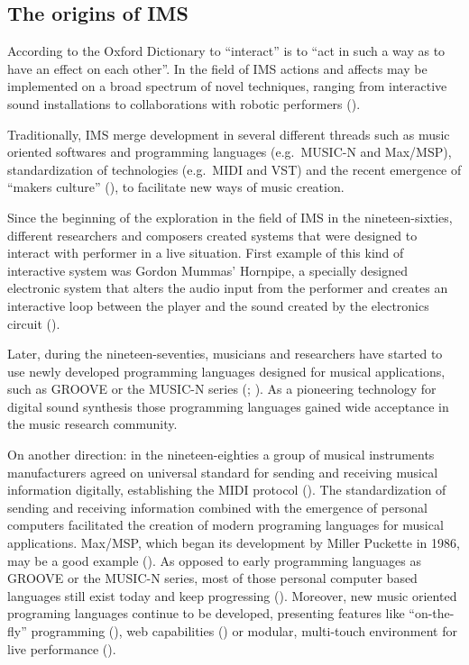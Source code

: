 \documentclass[a4paper,11pt]{article}
\begin{document}
\subsection{The origins of IMS}

According to the Oxford Dictionary to ``interact'' is to ``act in such a way as to have an effect on each other''.
In the field of IMS actions and affects may be implemented on a broad spectrum of novel techniques, ranging from interactive sound installations to collaborations with robotic performers (\cite{drummond09}).

Traditionally, IMS merge development in several different threads such as music oriented softwares and programming languages (e.g.\ MUSIC-N and Max/MSP), standardization of technologies (e.g.\ MIDI and VST) and the recent emergence of ``makers culture'' (), to facilitate new ways of music creation.

Since the beginning of the exploration in the field of IMS in the nineteen-sixties, different researchers and composers created systems that were designed to interact with performer in a live situation.
First example of this kind of interactive system was Gordon Mummas' Hornpipe, a specially designed electronic system that alters the audio input from the performer and creates an interactive loop between the player and the sound created by the electronics circuit (\cite[p. 12]{winkler01}).

Later, during the nineteen-seventies, musicians and researchers have started to use newly developed programming languages designed for musical applications, such as GROOVE or the MUSIC-N series (\cite{mathews70}; \cite{mathews69}).
As a pioneering technology for digital sound synthesis those programming languages gained wide acceptance in the music research community.

On another direction: in the nineteen-eighties a group of musical instruments manufacturers agreed on universal standard for sending and receiving musical information digitally, establishing the MIDI protocol (\cite{web:quinn}).
The standardization of sending and receiving information combined with the emergence of personal computers facilitated the creation of modern programing languages for musical applications.
Max/MSP, which began its development by Miller Puckette in 1986, may be a good example (\cite[p. 16]{winkler01}).
As opposed to early programming languages as GROOVE or the MUSIC-N series, most of those personal computer based languages still exist today and keep progressing ().
Moreover, new music oriented programing languages continue to be developed, presenting features like ``on-the-fly'' programming (\citeauthor{web:chuck}), web capabilities () or modular, multi-touch environment for live performance (\citeauthor{web:usine}).
\end{document}
